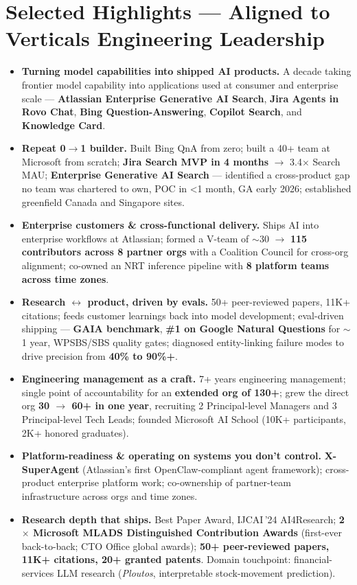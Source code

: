 \documentclass[10.5pt,letterpaper]{article}
\begin{document}
\section*{Selected Highlights --- Aligned to Verticals Engineering Leadership}
\begin{itemize}
  \item \textbf{Turning model capabilities into shipped AI products.} A decade taking frontier model capability into applications used at consumer and enterprise scale --- \textbf{Atlassian Enterprise Generative AI Search}, \textbf{Jira Agents in Rovo Chat}, \textbf{Bing Question-Answering}, \textbf{Copilot Search}, and \textbf{Knowledge Card}.
  \item \textbf{Repeat 0$\to$1 builder.} Built Bing QnA from zero; built a 40+ team at Microsoft from scratch; \textbf{Jira Search MVP in 4 months} $\to$ 3.4$\times$ Search MAU; \textbf{Enterprise Generative AI Search} --- identified a cross-product gap no team was chartered to own, POC in <1 month, GA early 2026; established greenfield Canada and Singapore sites.
  \item \textbf{Enterprise customers \& cross-functional delivery.} Ships AI into enterprise workflows at Atlassian; formed a V-team of $\sim$30 $\to$ \textbf{115 contributors across 8 partner orgs} with a Coalition Council for cross-org alignment; co-owned an NRT inference pipeline with \textbf{8 platform teams across time zones}.
  \item \textbf{Research $\leftrightarrow$ product, driven by evals.} 50+ peer-reviewed papers, 11K+ citations; feeds customer learnings back into model development; eval-driven shipping --- \textbf{GAIA benchmark}, \textbf{\#1 on Google Natural Questions} for $\sim$1 year, WPSBS/SBS quality gates; diagnosed entity-linking failure modes to drive precision from \textbf{40\% to 90\%+}.
  \item \textbf{Engineering management as a craft.} 7+ years engineering management; single point of accountability for an \textbf{extended org of 130+}; grew the direct org \textbf{30 $\to$ 60+ in one year}, recruiting 2 Principal-level Managers and 3 Principal-level Tech Leads; founded Microsoft AI School (10K+ participants, 2K+ honored graduates).
  \item \textbf{Platform-readiness \& operating on systems you don't control.} \textbf{X-SuperAgent} (Atlassian's first OpenClaw-compliant agent framework); cross-product enterprise platform work; co-ownership of partner-team infrastructure across orgs and time zones.
  \item \textbf{Research depth that ships.} Best Paper Award, IJCAI\,'24 AI4Research; \textbf{2$\times$ Microsoft MLADS Distinguished Contribution Awards} (first-ever back-to-back; CTO Office global awards); \textbf{50+ peer-reviewed papers, 11K+ citations, 20+ granted patents}. Domain touchpoint: financial-services LLM research (\textit{Ploutos}, interpretable stock-movement prediction).
\end{itemize}
\end{document}
